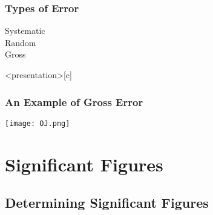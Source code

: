 \documentclass[notes=only]{beamer}
\begin{document}
\begin{frame}[t]
	\frametitle{Types of Error}
	\begin{description}
		\item[Systematic]

			\vfill

		\item[Random]

			\vfill

		\item[Gross]

			\vfill
	\end{description}

	\null

\end{frame}

\begin{frame}<presentation>[c]
	\frametitle{An Example of Gross Error}
	\begin{center}
		\texttt{[image: OJ.png]}
	\end{center}
\end{frame}


\section{Significant Figures}

\subsection{Determining Significant Figures}
\end{document}
